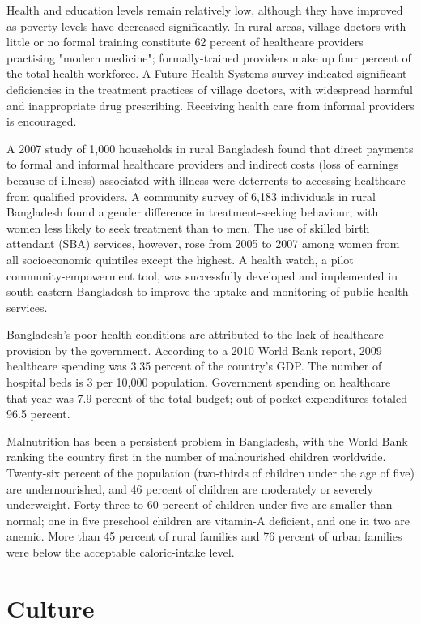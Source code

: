 Health and education levels remain relatively low, although they have
improved as poverty levels have decreased significantly. In rural areas,
village doctors with little or no formal training constitute 62 percent
of healthcare providers practising "modern medicine"; formally-trained
providers make up four percent of the total health workforce. A Future
Health Systems survey indicated significant deficiencies in the
treatment practices of village doctors, with widespread harmful and
inappropriate drug prescribing. Receiving health care from informal
providers is encouraged.

A 2007 study of 1,000 households in rural Bangladesh found that direct
payments to formal and informal healthcare providers and indirect costs
(loss of earnings because of illness) associated with illness were
deterrents to accessing healthcare from qualified providers. A community
survey of 6,183 individuals in rural Bangladesh found a gender
difference in treatment-seeking behaviour, with women less likely to
seek treatment than to men. The use of skilled birth attendant (SBA)
services, however, rose from 2005 to 2007 among women from all
socioeconomic quintiles except the highest. A health watch, a pilot
community-empowerment tool, was successfully developed and implemented
in south-eastern Bangladesh to improve the uptake and monitoring of
public-health services.

Bangladesh's poor health conditions are attributed to the lack of
healthcare provision by the government. According to a 2010 World Bank
report, 2009 healthcare spending was 3.35 percent of the country's GDP.
The number of hospital beds is 3 per 10,000 population. Government
spending on healthcare that year was 7.9 percent of the total budget;
out-of-pocket expenditures totaled 96.5 percent.

Malnutrition has been a persistent problem in Bangladesh, with the World
Bank ranking the country first in the number of malnourished children
worldwide. Twenty-six percent of the population (two-thirds of children
under the age of five) are undernourished, and 46 percent of children
are moderately or severely underweight. Forty-three to 60 percent of
children under five are smaller than normal; one in five preschool
children are vitamin-A deficient, and one in two are anemic. More than
45 percent of rural families and 76 percent of urban families were below
the acceptable caloric-intake level.

\section{Culture}\label{culture}

